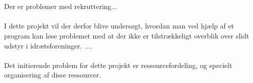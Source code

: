 \\
\\
Der er problemer med rekruttering...  
\\
\\
I dette projekt vil der derfor blive undersøgt, hvordan man ved hjælp af et program kan løse problemet med at der ikke er tilstrækkeligt overblik over slidt udstyr i idrætsforeninger. .... %
\\
\\
Det initierende problem for dette projekt er ressourcefordeling, og specielt organisering af disse ressourcer. 
\\
\\





